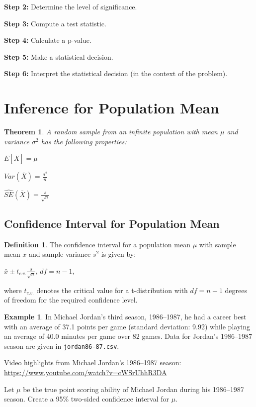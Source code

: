 \documentclass[
  11pt,
]{book}
\newtheorem{theorem}{Theorem}[chapter]
\theoremstyle{definition}
\newtheorem{definition}{Definition}[chapter]
\theoremstyle{definition}
\newtheorem{example}{Example}[chapter]
\theoremstyle{definition}
\theoremstyle{definition}
\theoremstyle{remark}
\begin{document}
\textbf{Step 2:} Determine the level of significance.\\
\vfill

\textbf{Step 3:} Compute a test statistic.\\
\vfill 

\textbf{Step 4:} Calculate a p-value.\\
\vfill

\textbf{Step 5:} Make a statistical decision.\\
\vfill

\textbf{Step 6:} Interpret the statistical decision (in the context of the problem).\\
\vfill

\newpage

\hypertarget{inference-for-population-mean}{%
\section{Inference for Population Mean}\label{inference-for-population-mean}}

\begin{theorem}
A random sample from an infinite population with mean \(\mu\) and variance \(\sigma^2\) has the following properties:

\(E[\bar{X}] = \mu\)

\(Var(\bar{X}) = \frac{\sigma^2}{n}\)

\(\hat{SE}(\bar{X}) = \frac{s}{\sqrt{n}}\)
\end{theorem}

\hypertarget{confidence-interval-for-population-mean}{%
\subsection{Confidence Interval for Population Mean}\label{confidence-interval-for-population-mean}}

\begin{definition}
The confidence interval for a population mean \(\mu\) with sample mean \(\bar{x}\) and sample variance \(s^2\) is given by:

\(\bar{x} \pm t_{c.v.}\frac{s}{\sqrt{n}}, \, df=n-1\),

where \(t_{c.v.}\) denotes the critical value for a t-distribution with \(df=n-1\) degrees of freedom for the required confidence level.
\end{definition}

\begin{example}
In Michael Jordan's third season, 1986--1987, he had a career best with an average of 37.1 points per game (standard deviation: 9.92) while playing an average of 40.0 minutes per game over 82 games. Data for Jordan's 1986--1987 season are given in \texttt{jordan86-87.csv}.

Video highlights from Michael Jordan's 1986--1987 season:\\
\url{https://www.youtube.com/watch?v=cWSrUhhR3DA}

Let \(\mu\) be the true point scoring ability of Michael Jordan during his 1986--1987 season. Create a 95\% two-sided confidence interval for \(\mu\).
\end{example}
\end{document}
